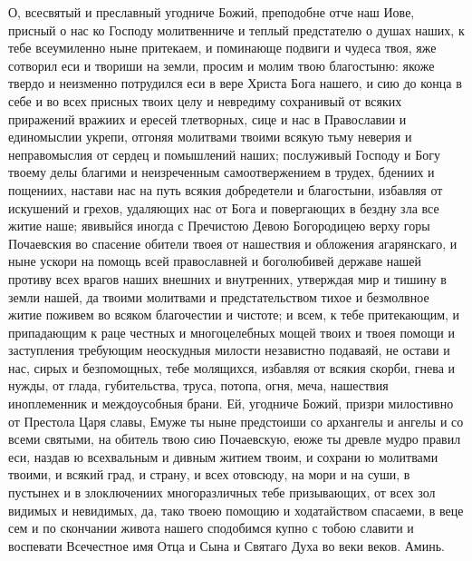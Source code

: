 \begin{mymulticols}
О, всесвятый и преславный угодниче Божий, преподобне отче наш Иове, присный о нас ко Господу молитвенниче и теплый предстателю о душах наших, к тебе всеумиленно ныне притекаем, и поминающе подвиги и чудеса твоя, яже сотворил еси и твориши на земли, просим и молим твою благостыню: якоже твердо и неизменно потрудился еси в вере Христа Бога нашего, и сию до конца в себе и во всех присных твоих целу и невредиму сохранивый от всяких приражений вражиих и ересей тлетворных, сице и нас в Православии и единомыслии укрепи, отгоняя молитвами твоими всякую тьму неверия и неправомыслия от сердец и помышлений наших; послуживый Господу и Богу твоему делы благими и неизреченным самоотвержением в трудех, бдениих и пощениих, настави нас на путь всякия добредетели и благостыни, избавляя от искушений и грехов, удаляющих нас от Бога и повергающих в бездну зла все житие наше; явивыйся иногда с Пречистою Девою Богородицею верху горы Почаевския во спасение обители твоея от нашествия и обложения агарянскаго, и ныне ускори на помощь всей православней и боголюбивей державе нашей противу всех врагов наших внешних и внутренних, утверждая мир и тишину в земли нашей, да твоими молитвами и предстательством тихое и безмолвное житие поживем во всяком благочестии и чистоте; и всем, к тебе притекающим, и припадающим к раце честных и многоцелебных мощей твоих и твоея помощи и заступления требующим неоскудныя милости независтно подаваяй, не остави и нас, сирых и безпомощных, тебе молящихся, избавляя от всякия скорби, гнева и нужды, от глада, губительства, труса, потопа, огня, меча, нашествия иноплеменник и междоусобныя брани. Ей, угодниче Божий, призри милостивно от Престола Царя славы, Емуже ты ныне предстоиши со архангелы и ангелы и со всеми святыми, на обитель твою сию Почаевскую, еюже ты древле мудро правил еси, наздав ю всехвальным и дивным житием твоим, и сохрани ю молитвами твоими, и всякий град, и страну, и всех отовсюду, на мори и на суши, в пустынех и в злоключениих многоразличных тебе призывающих, от всех зол видимых и невидимых, да, тако твоею помощию и ходатайством спасаеми, в веце сем и по скончании живота нашего сподобимся купно с тобою славити и воспевати Всечестное имя Отца и Сына и Святаго Духа во веки веков. Аминь.

\end{mymulticols}
